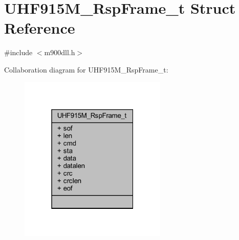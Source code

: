 \hypertarget{struct_u_h_f915_m___rsp_frame__t}{}\section{U\+H\+F915\+M\+\_\+\+Rsp\+Frame\+\_\+t Struct Reference}
\label{struct_u_h_f915_m___rsp_frame__t}


{\ttfamily \#include $<$m900dll.\+h$>$}



Collaboration diagram for U\+H\+F915\+M\+\_\+\+Rsp\+Frame\+\_\+t\+:
\nopagebreak
\begin{figure}[H]
\begin{center}
\leavevmode
\includegraphics[width=199pt]{struct_u_h_f915_m___rsp_frame__t__coll__graph}
\end{center}
\end{figure}
